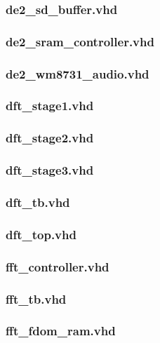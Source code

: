 \documentclass{article}
\begin{document}
	\subsubsection{de2\_sd\_buffer.vhd}
	
	\subsubsection{de2\_sram\_controller.vhd}
	
	\subsubsection{de2\_wm8731\_audio.vhd}
	
	\subsubsection{dft\_stage1.vhd}
	
	\subsubsection{dft\_stage2.vhd}
	
	\subsubsection{dft\_stage3.vhd}
	
	\subsubsection{dft\_tb.vhd}
	
	\subsubsection{dft\_top.vhd}
	
	\subsubsection{fft\_controller.vhd}
	
	\subsubsection{fft\_tb.vhd}
	
	\subsubsection{fft\_fdom\_ram.vhd}
	
\end{document}
